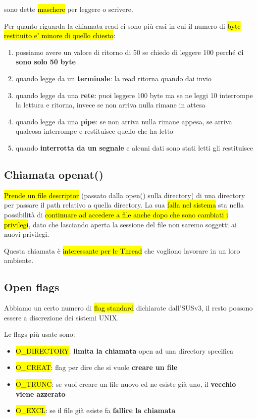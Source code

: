 sono dette \hl{maschere} per leggere o scrivere.

Per quanto riguarda la chiamata read ci sono più casi in cui il numero di \hl{byte restituito e' minore di quello chiesto}:

\begin{enumerate}
	\item possiamo avere un valore di ritorno di 50 se chiedo di leggere 100 perché \textbf{ci sono solo 50 byte}
	\item quando legge da un \textbf{terminale}: la read ritorna quando dai invio
	\item quando legge da una \textbf{rete}: puoi leggere 100 byte ma se ne leggi 10 interrompe la lettura e ritorna, invece se non arriva nulla rimane in attesa
	\item quando legge da una \textbf{pipe}: se non arriva nulla rimane appesa, se arriva qualcosa interrompe e restituisce quello che ha letto
	\item quando \textbf{interrotta da un segnale} e alcuni dati sono stati letti gli restituisce
\end{enumerate} 


\subsection{Chiamata openat()}

\hl{Prende un file descriptor} (passato dalla open() sulla directory) di una directory per passare il path relativo a quella directory. La sua \hl{falla nel sistema} sta nella possibilità di \hl{continuare ad accedere a file anche dopo che sono cambiati i privilegi}, dato che lasciando aperta la sessione del file non saremo soggetti ai nuovi privilegi.

Questa chiamata è \hl{interessante per le Thread} che vogliono lavorare in un loro ambiente.


\subsection{Open flags}

Abbiamo un certo numero di \hl{flag standard} dichiarate dall'SUSv3, il resto possono essere a discrezione dei sistemi UNIX.

Le flags più usate sono:

\begin{itemize}
	\item \hl{O\_DIRECTORY}: \textbf{limita la chiamata} open ad una directory specifica

	\item \hl{O\_CREAT}: flag per dire che si vuole \textbf{creare un file}

	\item \hl{O\_TRUNC}: se vuoi creare un file nuovo ed ne esiste già uno, il \textbf{vecchio viene azzerato}

	\item \hl{O\_EXCL}: se il file già esiste fa \textbf{fallire la chiamata}
\end{itemize}


